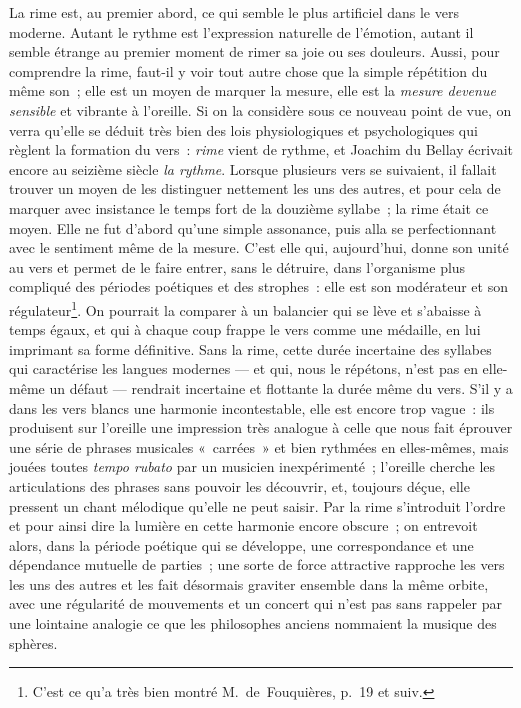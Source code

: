 \documentclass[french,twoside]{book} %
\begin{document}
 La rime est, au premier abord, ce qui semble le plus artificiel dans le vers moderne. Autant le rythme est l’expression naturelle de l’émotion, autant il semble étrange au premier moment de rimer sa joie ou ses douleurs. Aussi, pour comprendre la rime, faut-il y voir tout autre chose que la simple répétition du même son ; elle est un moyen de marquer la mesure, elle est la \emph{mesure devenue sensible} et vibrante à l’oreille. Si on la considère sous ce nouveau point de vue, on verra qu’elle se déduit très bien des lois physiologiques et psychologiques qui règlent la formation du vers : \emph{rime} vient de rythme, et Joachim du Bellay écrivait encore au seizième siècle \emph{la rythme}. Lorsque plusieurs vers se suivaient, il fallait trouver un moyen de les distinguer nettement les uns des autres, et pour cela de marquer avec insistance le temps fort de la douzième syllabe ; la rime était ce moyen. Elle ne fut d’abord qu’une simple assonance, puis alla se perfectionnant avec le sentiment même de la mesure. C’est elle qui, aujourd’hui, donne son unité au vers et permet de le faire entrer, sans le détruire, dans l’organisme plus compliqué  des périodes poétiques et des strophes : elle est son modérateur et son régulateur\footnote{C’est ce qu’a très bien montré M. de Fouquières, p. 19 et suiv.}. On pourrait la comparer à un balancier qui se lève et s’abaisse à temps égaux, et qui à chaque coup frappe le vers comme une médaille, en lui imprimant sa forme définitive. Sans la rime, cette durée incertaine des syllabes qui caractérise les langues modernes — et qui, nous le répétons, n’est pas en elle-même un défaut — rendrait incertaine et flottante la durée même du vers. S’il y a dans les vers blancs une harmonie incontestable, elle est encore trop vague : ils produisent sur l’oreille une impression très analogue à celle que nous fait éprouver une série de phrases musicales « carrées » et bien rythmées en elles-mêmes, mais jouées toutes \emph{tempo rubato} par un musicien inexpérimenté ; l’oreille cherche les articulations des phrases sans pouvoir les découvrir, et, toujours déçue, elle pressent un chant mélodique qu’elle ne peut saisir. Par la rime s’introduit l’ordre et pour ainsi dire la lumière en cette harmonie encore obscure ; on entrevoit alors, dans la période poétique qui se développe, une correspondance et une dépendance mutuelle de parties ; une sorte de force attractive rapproche les vers les uns des autres et les fait désormais graviter ensemble dans la même orbite, avec une régularité de mouvements et un concert qui n’est pas sans rappeler par une lointaine analogie ce que les philosophes anciens nommaient la musique des sphères.\par
\end{document}
